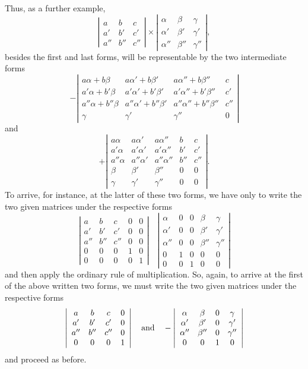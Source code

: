 \documentclass[11pt]{article}
\begin{document}
{{Thus, as a further example,
\[
\left|\begin{array}{ccc}
a&b&c\\
a'&b'&c'\\
a''&b''&c''
\end{array}\right|
\times
\left|\begin{array}{ccc}
\alpha&\beta&\gamma\\
\alpha'&\beta'&\gamma'\\
\alpha''&\beta''&\gamma''
\end{array}\right|,
\]
besides the first and last forms, will be representable by the two intermediate forms
\[
-\left|\begin{array}{cccc}
a\alpha+b\beta&a\alpha'+b\beta'&a\alpha''+b\beta''&c\\
a'\alpha+b'\beta&a'\alpha'+b'\beta'&a'\alpha''+b'\beta''&c'\\
a''\alpha+b''\beta&a''\alpha'+b''\beta'&a''\alpha''+b''\beta''&c''\\
\gamma&\gamma'&\gamma''&0
\end{array}\right|
\]
and
\[
+\left|\begin{array}{ccccc}
a\alpha&a\alpha'&a\alpha''&b&c\\
a'\alpha&a'\alpha'&a'\alpha''&b'&c'\\
a''\alpha&a''\alpha'&a''\alpha''&b''&c''\\
\beta&\beta'&\beta''&0&0\\
\gamma&\gamma'&\gamma''&0&0
\end{array}\right|.
\]
To arrive, for instance, at the latter of these two forms, we have only to write the two given matrices under the respective forms
\[
\left|\begin{array}{ccccc}
a&b&c&0&0\\
a'&b'&c'&0&0\\
a''&b''&c''&0&0\\
0&0&0&1&0\\
0&0&0&0&1
\end{array}\right|
\quad
\left|\begin{array}{ccccc}
\alpha&0&0&\beta&\gamma\\
\alpha'&0&0&\beta'&\gamma'\\
\alpha''&0&0&\beta''&\gamma''\\
0&1&0&0&0\\
0&0&1&0&0
\end{array}\right|
\]
and then apply the ordinary rule of multiplication. So, again, to arrive at the first of the above written two forms, we must write the two given matrices under the respective forms
\[
\left|\begin{array}{cccc}
a&b&c&0\\
a'&b'&c'&0\\
a''&b''&c''&0\\
0&0&0&1
\end{array}\right|
\quad\hbox{and}\quad
-\left|\begin{array}{cccc}
\alpha&\beta&0&\gamma\\
\alpha'&\beta'&0&\gamma'\\
\alpha''&\beta''&0&\gamma''\\
0&0&1&0
\end{array}\right|
\]
and proceed as before.

}}
\end{document}
